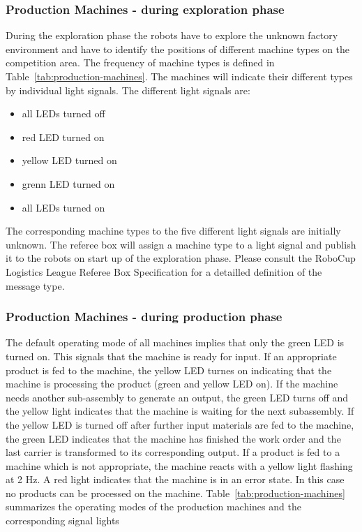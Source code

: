 \documentclass[12pt,twoside]{article}
\begin{document}
\subsubsection{Production Machines - during exploration phase}
\label{sec:production-machines-exp}
During the exploration phase the robots have to explore the unknown factory
environment and have to identify the positions of different machine types on the
competition area. The frequency of machine types is defined in
Table~\ref{tab:production-machines}. The machines will indicate their different
types by individual light signals. The different light
signals are:
\begin{itemize}
\item all LEDs turned off
\item red LED turned on
\item yellow LED turned on
\item grenn LED turned on
\item all LEDs turned on
\end{itemize}
The corresponding machine types to the five different light signals are
initially unknown. The referee box will assign a machine type to a light signal
and publish it to the robots on start up of the exploration phase. Please
consult the RoboCup Logistics League Referee Box Specification for a detailled
definition of the message type.

\subsubsection{Production Machines - during production phase}
The default operating mode of all machines implies that only the green LED is
turned on. This signals that the machine is ready for input. If an appropriate
product is fed to the machine, the yellow LED turnes on indicating that the
machine is processing the product (green and yellow LED on). If the machine needs another
sub-assembly to generate an output, the green LED turns off and the yellow light
indicates that the machine is waiting for the next subassembly. If the yellow
LED is turned off after further input materials are fed to the machine, the
green LED indicates that the machine has finished the work order and the last
carrier is transformed to its corresponding output. If a product is fed to a
machine which is not appropriate, the machine reacts with a yellow light
flashing at 2 Hz. A red light indicates that the machine is in an error state.
In this case no products can be processed on the machine.
Table~\ref{tab:production-machines} summarizes the operating modes of the
production machines and the corresponding signal lights
\end{document}
